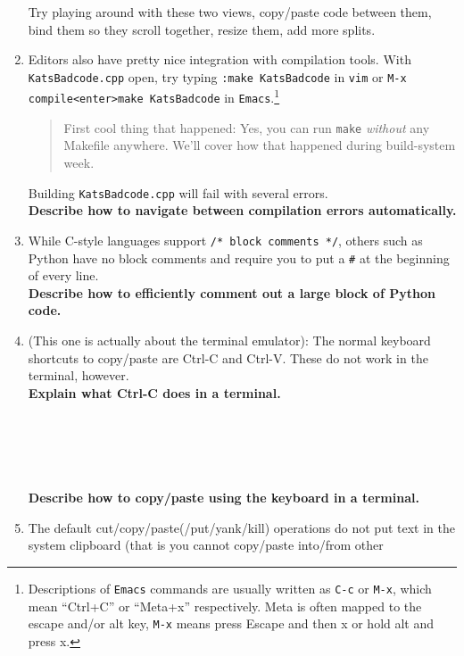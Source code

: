 \documentclass{article}
\begin{document}
\begin{enumerate}
    Try playing around with these two views, copy/paste code between them,
    bind them so they scroll together, resize them, add more splits.\\
  \item Editors also have pretty nice integration with compilation tools. With
    \texttt{KatsBadcode.cpp} open, try typing \texttt{:make KatsBadcode} in
    \texttt{vim} or \texttt{M-x compile<enter>make KatsBadcode} in
    \texttt{Emacs}.\footnote{
      Descriptions of \texttt{Emacs} commands are usually written as
      \texttt{C-c} or \texttt{M-x}, which mean ``Ctrl+C'' or ``Meta+x''
      respectively. Meta is often mapped to the escape and/or alt key,
      \texttt{M-x} means press Escape and then x or hold alt and press x.
    }
    \begin{quote}
      First cool thing that happened: Yes, you can run \texttt{make}
      \emph{without} any Makefile anywhere. We'll cover how that happened
      during build-system week.
    \end{quote}
    Building \texttt{KatsBadcode.cpp} will fail with several errors.\\
    \textbf{Describe how to navigate between compilation errors automatically.}
    \vspace{6em}
  \item While C-style languages support \texttt{/* block comments */}, others
    such as Python have no block comments and require you to put a \texttt{\#}
    at the beginning of every line.\\
    \textbf{Describe how to efficiently comment out a large block of Python code.}
    \vspace{6em}
  \item (This one is actually about the terminal emulator): The normal
    keyboard shortcuts to copy/paste are Ctrl-C and Ctrl-V. These do not work
    in the terminal, however.\\
    \textbf{Explain what Ctrl-C does in a terminal.}\\
    ~\\
    ~\\
    ~\\
    ~\\
    ~\\
    \textbf{Describe how to copy/paste using the keyboard in a terminal.}
    \vspace{6em}
  \item The default cut/copy/paste(/put/yank/kill) operations do not put text in
    the system clipboard (that is you cannot copy/paste into/from other

\end{enumerate}
\end{document}
